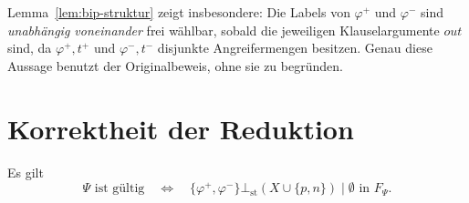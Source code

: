 Lemma~\ref{lem:bip-struktur} zeigt insbesondere: Die Labels von
\(\varphi^{+}\) und \(\varphi^{-}\) sind \emph{unabhängig voneinander} frei
wählbar, sobald die jeweiligen Klauselargumente \(\mathit{out}\) sind, da
\(\varphi^{+},t^{+}\) und \(\varphi^{-},t^{-}\) disjunkte Angreifermengen
besitzen. Genau diese Aussage benutzt der Originalbeweis, ohne sie zu begründen.

\section{Korrektheit der Reduktion}
\label{sec:bip-analyse-korrektheit}

\begin{Proposition}
    \label{prop:bip-korrekt}
    Es gilt
    \[
        \Psi\text{ ist gültig}
        \quad\Longleftrightarrow\quad
        \{\varphi^{+},\varphi^{-}\}\bot_{\mathrm{st}}(X\cup\{p,n\})\mid\emptyset
        \text{ in }F_\Psi.
    \]
\end{Proposition}

